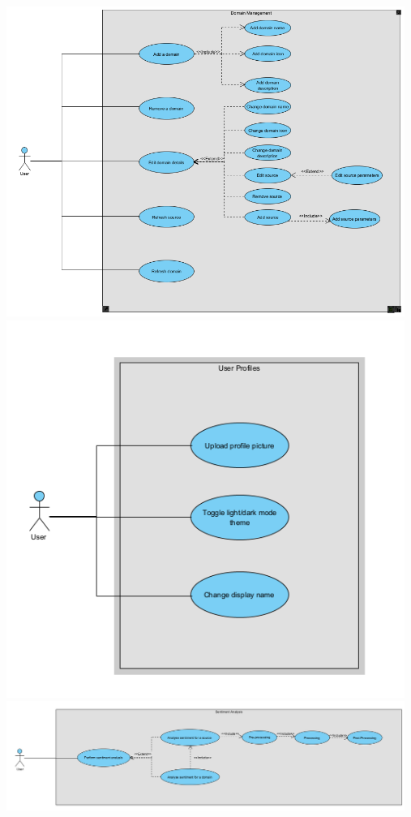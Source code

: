 \documentclass[12pt]{article}
\begin{document}
\begin{center}
  \includegraphics[width=13cm]{../../Images/UC 2.3.png}
  \includegraphics[width=13cm]{../../Images/UC 2.4.png}
  \includegraphics[width=13cm]{../../Images/UC 2.5.png}
\end{center}
\end{document}
